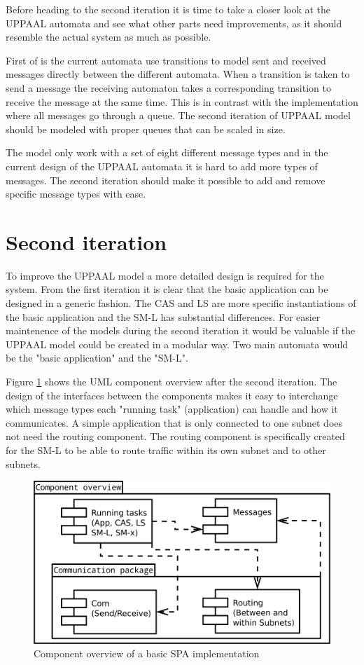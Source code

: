 Before heading to the second iteration it is time to take a closer look at the
UPPAAL automata and see what other parts need improvements, as it should
resemble the actual system as much as possible.

First of is the current automata use transitions to model sent and
received messages directly between the different automata. When a transition is
taken to send a message the receiving automaton takes a corresponding
transition to receive the message at the same time. This is in contrast with the
implementation where all messages go through a queue. The second iteration of
UPPAAL model should be modeled with proper queues that can be scaled in size.

The model only work with a set of eight different message types and in the
current design of the UPPAAL automata it is hard to add more types of messages.
The second iteration should make it possible to add and remove
specific message types with ease.

\section{Second iteration}
To improve the UPPAAL model a more detailed design is required for the system.
From the first iteration it is clear that the basic application can be designed
in a generic fashion. The CAS and LS are more specific instantiations of the
basic application and the SM-L has substantial differences. For easier
maintenence of the models during the second iteration it would be valuable if
the UPPAAL model could be created in a modular way. Two main automata would be the
"basic application" and the "SM-L".

Figure \ref{fig:iteration2_uml_component_overview} shows the UML component
overview after the second iteration. The design of the interfaces between the
components makes it easy to interchange which message types each "running task"
(application) can handle and how it communicates. A simple application that is
only connected to one subnet does not need the routing component. The routing
component is specifically created for the SM-L to be able to route traffic
within its own subnet and to other subnets.

\begin{figure}[h]
    \centering
    \includegraphics[width=\textwidth]{figures/iteration2_uml_component_overview}
    \caption{Component overview of a basic SPA implementation}
    \label{fig:iteration2_uml_component_overview}
\end{figure}

